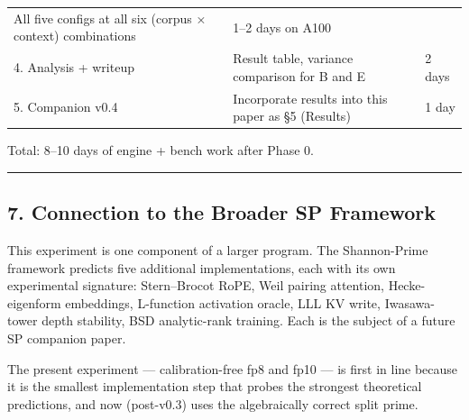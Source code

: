 \documentclass[
  11pt,
]{article}
\begin{document}
\begin{longtable}[]{@{}lll@{}}
\begin{minipage}[t]{0.30\columnwidth}
All five configs at all six (corpus × context) combinations\strut
\end{minipage} & \begin{minipage}[t]{0.30\columnwidth}\raggedright
1--2 days on A100\strut
\end{minipage}\tabularnewline
\begin{minipage}[t]{0.30\columnwidth}\raggedright
4. Analysis + writeup\strut
\end{minipage} & \begin{minipage}[t]{0.30\columnwidth}\raggedright
Result table, variance comparison for B and E\strut
\end{minipage} & \begin{minipage}[t]{0.30\columnwidth}\raggedright
2 days\strut
\end{minipage}\tabularnewline
\begin{minipage}[t]{0.30\columnwidth}\raggedright
5. Companion v0.4\strut
\end{minipage} & \begin{minipage}[t]{0.30\columnwidth}\raggedright
Incorporate results into this paper as §5 (Results)\strut
\end{minipage} & \begin{minipage}[t]{0.30\columnwidth}\raggedright
1 day\strut
\end{minipage}\tabularnewline
\bottomrule
\end{longtable}

Total: 8--10 days of engine + bench work after Phase 0.

\begin{center}\rule{0.5\linewidth}{0.5pt}\end{center}

\hypertarget{connection-to-the-broader-sp-framework}{%
\subsection{7. Connection to the Broader SP
Framework}\label{connection-to-the-broader-sp-framework}}

This experiment is one component of a larger program. The Shannon-Prime
framework predicts five additional implementations, each with its own
experimental signature: Stern--Brocot RoPE, Weil pairing attention,
Hecke-eigenform embeddings, L-function activation oracle, LLL KV write,
Iwasawa-tower depth stability, BSD analytic-rank training. Each is the
subject of a future SP companion paper.

The present experiment --- calibration-free fp8 and fp10 --- is first in
line because it is the smallest implementation step that probes the
strongest theoretical predictions, and now (post-v0.3) uses the
algebraically correct split prime.
\end{document}
